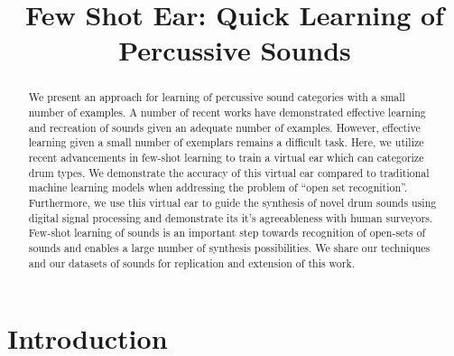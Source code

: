 \documentclass{article}
\title{Few Shot Ear: Quick Learning of Percussive Sounds}
\begin{document}
%
\maketitle
%
\begin{abstract}

We present an approach for learning of percussive sound categories with a small number of examples. 
A number of recent works have demonstrated effective learning and recreation of sounds given an adequate number of examples. 
However, effective learning given a small number of exemplars remains a difficult task.
Here, we utilize recent advancements in few-shot learning to train a virtual ear which can categorize drum types.
We demonstrate the accuracy of this virtual ear compared to traditional machine learning models when addressing the problem of ``open set recognition''.
Furthermore, we use this virtual ear to guide the synthesis of novel drum sounds using digital signal processing and demonstrate its
it's agreeableness with human surveyors. 
Few-shot learning of sounds is an important step towards recognition of open-sets of sounds and enables a large number of synthesis possibilities. We share our techniques and our datasets of sounds for replication and extension of this work. 

\end{abstract}
%
\begin{keywords}

\end{keywords}
%
\section{Introduction}
\label{sec:intro}



\end{document}
